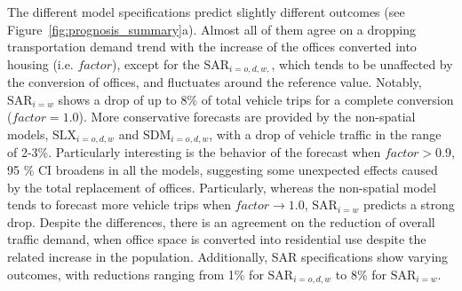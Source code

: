 The different model specifications predict slightly different outcomes (see Figure~\ref{fig:prognosis_summary}a). Almost all of them agree on a dropping transportation demand trend with the increase of the offices converted into housing (i.e. $\mathit{factor}$), except for the $\text{SAR}_{i=o,d,w,}$, which tends to be unaffected by the conversion of offices, and fluctuates around the reference value. Notably, $\text{SAR}_{i=w}$ shows a drop of up to 8\% of total vehicle trips for a complete conversion ($\mathit{factor}=1.0$).  More conservative forecasts are provided by the non-spatial models, $\text{SLX}_{i=o,d,w}$ and $\text{SDM}_{i=o,d,w}$, with a drop of vehicle traffic in the range of 2-3\%. 
Particularly interesting is the behavior of the forecast when $\mathit{factor}>0.9$, 95 \% CI broadens in all the models, suggesting some unexpected effects caused by the total replacement of offices. 
Particularly, whereas the non-spatial model tends to forecast more vehicle trips when $\mathit{factor}\rightarrow1.0$, $\text{SAR}_{i=w}$ predicts a strong drop. Despite the differences, there is an agreement on the reduction of overall traffic demand, when office space is converted into residential use despite the related increase in the population.
Additionally, SAR specifications show varying outcomes, with reductions ranging from 1\% for \(\text{SAR}_{i=o,d,w}\) to 8\% for \(\text{SAR}_{i=w}\).





